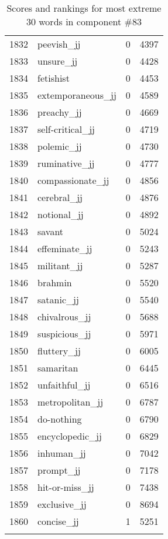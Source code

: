 \begin{longtable}[!htbp]{| rlr@{.}l |}
    1832 & peevish\_jj & 0 & 4397 \\
    1833 & unsure\_jj & 0 & 4428 \\
    1834 & fetishist & 0 & 4453 \\
    1835 & extemporaneous\_jj & 0 & 4589 \\
    1836 & preachy\_jj & 0 & 4669 \\
    1837 & self-critical\_jj & 0 & 4719 \\
    1838 & polemic\_jj & 0 & 4730 \\
    1839 & ruminative\_jj & 0 & 4777 \\
    1840 & compassionate\_jj & 0 & 4856 \\
    1841 & cerebral\_jj & 0 & 4876 \\
    1842 & notional\_jj & 0 & 4892 \\
    1843 & savant & 0 & 5024 \\
    1844 & effeminate\_jj & 0 & 5243 \\
    1845 & militant\_jj & 0 & 5287 \\
    1846 & brahmin & 0 & 5520 \\
    1847 & satanic\_jj & 0 & 5540 \\
    1848 & chivalrous\_jj & 0 & 5688 \\
    1849 & suspicious\_jj & 0 & 5971 \\
    1850 & fluttery\_jj & 0 & 6005 \\
    1851 & samaritan & 0 & 6445 \\
    1852 & unfaithful\_jj & 0 & 6516 \\
    1853 & metropolitan\_jj & 0 & 6787 \\
    1854 & do-nothing & 0 & 6790 \\
    1855 & encyclopedic\_jj & 0 & 6829 \\
    1856 & inhuman\_jj & 0 & 7042 \\
    1857 & prompt\_jj & 0 & 7178 \\
    1858 & hit-or-miss\_jj & 0 & 7438 \\
    1859 & exclusive\_jj & 0 & 8694 \\
    1860 & concise\_jj & 1 & 5251 \\
    \hline
    \caption{Scores and rankings for most extreme 30 words in component \#83} \\
\end{longtable}
